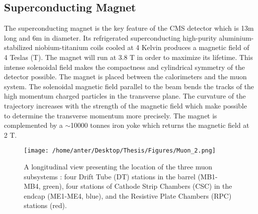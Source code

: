 \subsection{Superconducting Magnet}
The superconducting magnet is the key feature of the CMS detector which is 13m long and 6m in diameter. Its refrigerated superconducting high-purity aluminium-stabilized niobium-titanium coils cooled at 4 Kelvin produces a magnetic field of 4 Teslas (T). The magnet will run at 3.8 T in order to maximize its lifetime. This intense solenoidal field makes the compactness and cylindrical symmetry of the detector possible. The magnet is placed between the calorimeters and the muon system. The solenoidal magnetic field parallel to the beam bends the tracks of the high momentum charged particles in the transverse plane. The curvature of the trajectory increases with the strength of the magnetic field which make possible to determine the transverse momentum more precisely. The magnet is complemented by a $\sim$10000 tonnes iron yoke which returns the magnetic field at 2 T.

\begin{figure}[!h]
\begin{center}
\vspace*{3mm} 
\hspace*{-5mm}
\texttt{[image: /home/anter/Desktop/Thesis/Figures/Muon\_2.png]}\\
\vspace*{4mm}
\caption[Muon]{A longitudinal view presenting the location of the three muon subsystems : four Drift Tube (DT) stations in the barrel (MB1-MB4, green), four stations of Cathode Strip Chambers (CSC) in the endcap (ME1-ME4, blue), and the Resistive Plate Chambers (RPC) stations (red)\footnotemark.}
\label{fig:muon}
\end{center}
\end{figure}

